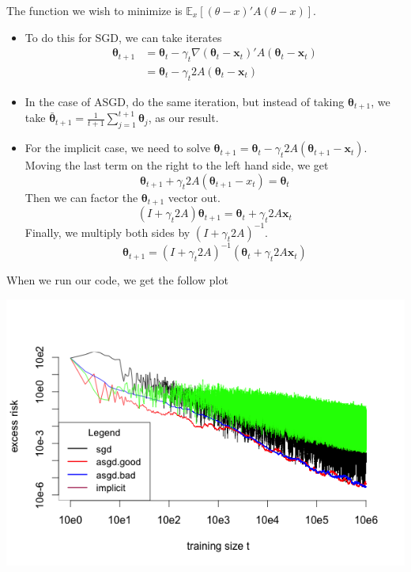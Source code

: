 \documentclass[letterpaper,10pt]{amsart}
\newcommand{\Esub}[2]{\mathbb{E}_{#1}\left[#2\right]}
\begin{document}
\begin{enumerate}[1.]
\begin{enumerate}[(a)]
The function we wish to minimize is $\Esub{x}{(\theta - x)' A(\theta - x)}$. 
\begin{itemize}
\item 
To do this for SGD, we can take iterates
\begin{align*}
\boldsymbol \theta_{t+1} &= \boldsymbol \theta_t - \gamma_t \nabla (\boldsymbol \theta_t - \boldsymbol x_t)' A (\boldsymbol \theta_t - \boldsymbol x_t)\\
&= \boldsymbol \theta_t - \gamma_t 2A(\boldsymbol \theta_t - \boldsymbol x_t)
\end{align*}
\item 
In the case of ASGD, do the same iteration, but instead of taking $\boldsymbol \theta_{t+1}$, we take $\bar{\boldsymbol \theta}_{t+1} = \frac{1}{t+1} \sum_{j=1}^{t+1} \boldsymbol \theta_j$, as our result. 
\item
For the implicit case, we need to solve $\boldsymbol \theta_{t+1} = \boldsymbol \theta_t - \gamma_t 2A(\boldsymbol \theta_{t+1} - \boldsymbol x_t)$. Moving the last term on the right to the left hand side, we get
\[\boldsymbol \theta_{t+1} + \gamma_t 2A(\boldsymbol \theta_{t+1} - x_t) = \boldsymbol \theta_t\]
Then we can factor the $\boldsymbol \theta_{t+1}$ vector out.
\[(I + \gamma_t 2A)\boldsymbol \theta_{t+1} = \boldsymbol \theta_t + \gamma_t 2A \boldsymbol x_t\]
Finally, we multiply both sides by $(I + \gamma_t 2 A)^{-1}$.
\[\boldsymbol \theta_{t+1} = (I + \gamma_t 2A)^{-1}(\boldsymbol \theta_t + \gamma_t 2 A \boldsymbol x_t)\]
\end{itemize}

When we run our code, we get the follow plot
\begin{center}
\includegraphics[scale=0.8]{221Ass3-Q2-a.png}
\end{center}



\end{enumerate}
\end{enumerate}
\end{document}

